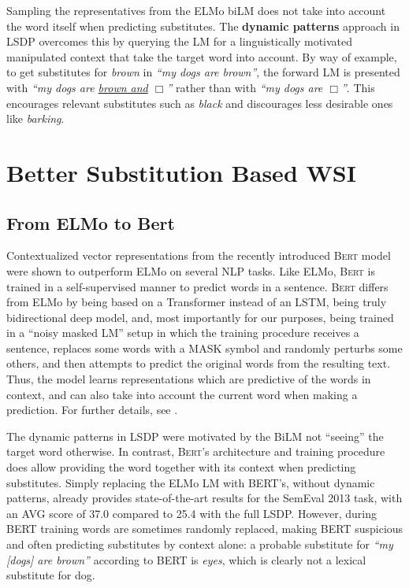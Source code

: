 \documentclass[11pt,a4paper]{article}
\begin{document}
Sampling the representatives from the ELMo biLM does not take into account the
word itself when predicting substitutes. The \textbf{dynamic patterns} approach
in LSDP overcomes this by querying the LM for a linguistically motivated
manipulated context that
take the target word into account. 
By way of example, to get substitutes for \emph{brown} in \emph{``my dogs are
brown''}, the forward LM is presented with \emph{``my dogs are \underline{brown and} $\Box$''} rather than with \emph{``my dogs are $\Box$''}. This encourages relevant substitutes
such as \emph{black} and discourages less desirable ones like \emph{barking}.


\section{Better Substitution Based WSI}

\subsection{From ELMo to Bert}
Contextualized vector representations from the recently introduced \textsc{Bert} model \cite{devlin2018bert} were shown to outperform ELMo on several NLP tasks. Like ELMo, \textsc{Bert} is trained in a self-supervised manner to predict words in a sentence. \textsc{Bert} differs from ELMo by being based on a Transformer \cite{vaswani2017attention} instead of an LSTM, being truly bidirectional deep model, and, most importantly for our purposes, being trained in a ``noisy masked LM'' setup in which the training procedure receives a sentence, replaces some words with a MASK symbol and randomly perturbs some others, and then attempts to predict the original words from the resulting text. Thus, the model learns representations which are predictive of the words in context, and can also take into account the current word when making a prediction. For further details, see \cite{devlin2018bert}.

The dynamic patterns in LSDP were motivated by the BiLM not ``seeing'' the
target word otherwise. In contrast, \textsc{Bert}'s architecture and training procedure
does allow providing the word together with its context when predicting
substitutes. %
Simply replacing the ELMo LM with BERT's, without dynamic patterns, already provides state-of-the-art
results for the SemEval 2013 task, with an AVG score of 37.0 compared to 25.4 with
the full LSDP.
However, during BERT training words are sometimes randomly replaced, making
BERT suspicious and often predicting substitutes by context alone: a probable
substitute for \emph{``my [dogs] are brown''} according to BERT is \emph{eyes}, which is clearly not a lexical substitute for dog.
\end{document}
